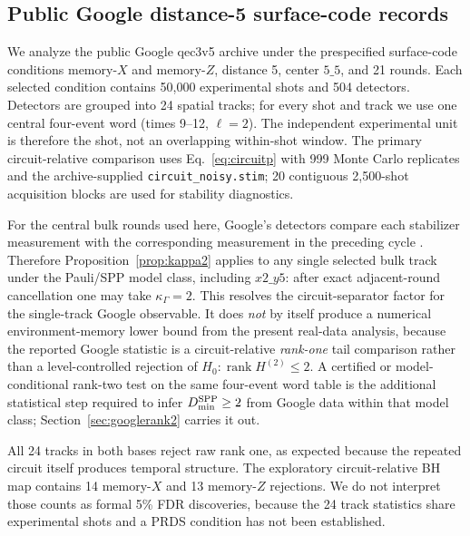 \documentclass[11pt]{article}
\newcommand{\rank}{\operatorname{rank}}
\begin{document}
\subsection{Public Google distance-5 surface-code records}
\label{sec:google}

We analyze the public Google qec3v5 archive \cite{google2023surface,google2022data} under the prespecified surface-code conditions memory-$X$ and memory-$Z$, distance 5, center $5\_5$, and 21 rounds. Each selected condition contains 50,000 experimental shots and 504 detectors. Detectors are grouped into 24 spatial tracks; for every shot and track we use one central four-event word (times 9--12, $\ell=2$). The independent experimental unit is therefore the shot, not an overlapping within-shot window. The primary circuit-relative comparison uses Eq.~\eqref{eq:circuitp} with 999 Monte Carlo replicates and the archive-supplied \texttt{circuit\_noisy.stim}; 20 contiguous 2,500-shot acquisition blocks are used for stability diagnostics.

For the central bulk rounds used here, Google's detectors compare each stabilizer measurement with the corresponding measurement in the preceding cycle \cite{google2023surface}. Therefore Proposition~\ref{prop:kappa2} applies to any single selected bulk track under the Pauli/SPP model class, including $x2\_y5$: after exact adjacent-round cancellation one may take $\kappa_\Gamma=2$. This resolves the circuit-separator factor for the single-track Google observable. It does \emph{not} by itself produce a numerical environment-memory lower bound from the present real-data analysis, because the reported Google statistic is a circuit-relative \emph{rank-one} tail comparison rather than a level-controlled rejection of $H_0:\rank H^{(2)}\le2$. A certified or model-conditional rank-two test on the same four-event word table is the additional statistical step required to infer $D_{\min}^{\rm SPP}\ge2$ from Google data within that model class; Section~\ref{sec:googlerank2} carries it out.

All 24 tracks in both bases reject raw rank one, as expected because the repeated circuit itself produces temporal structure. The exploratory circuit-relative BH map contains 14 memory-$X$ and 13 memory-$Z$ rejections. We do not interpret those counts as formal 5\% FDR discoveries, because the 24 track statistics share experimental shots and a PRDS condition has not been established.
\end{document}
